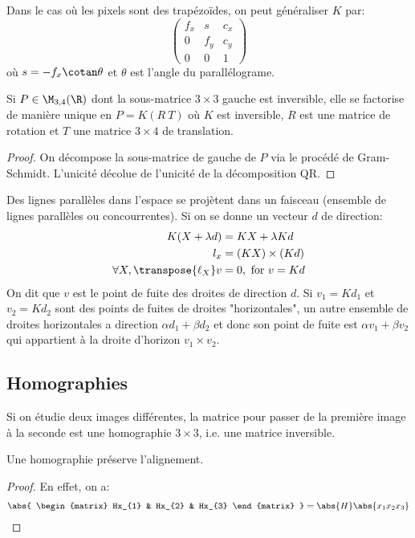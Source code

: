 \documentclass[info, math]{mpb-cours}
\begin{document}
Dans le cas où les pixels sont des trapézoïdes, on peut généraliser $K$ par:
\begin{equation*}
	\begin{pmatrix}
		f_{x} & s & c_{x} \\ 0 & f_{y} & c_{y}\\ 0 & 0 & 1
	\end{pmatrix}
\end{equation*}
où $s = -f_{x} \cotan \theta$ et $\theta$ est l'angle du parallélograme.

\begin{thm}
	Si $P \in \M_{3, 4}(\R)$ dont la sous-matrice $3\times 3$ gauche est inversible, elle se
	factorise de manière unique en $P = K (R \ T)$ où $K$ est inversible, $R$ est une matrice
	de rotation et $T$ une matrice $3 \times 4$ de translation.
\end{thm}
\begin{proof}
	On décompose la sous-matrice de gauche de $P$ via le procédé de Gram-Schmidt. L'unicité décolue de l'unicité de la décomposition QR.
\end{proof}

Des lignes parallèles dans l'espace se projètent dans un faisceau (ensemble de lignes parallèles ou concourrentes).
Si on se donne un vecteur $d$ de direction:
\begin{equation*}
	\begin{aligned}
		K(X + \lambda d)                 & = KX + \lambda Kd        \\
		l_{x}                            & = (KX) \times (Kd)       \\
		\forall X, \transpose{\ell_{X}}v & = 0, \text{ for } v = Kd
	\end{aligned}
\end{equation*}
On dit que $v$ est le point de fuite des droites de direction $d$.
Si $v_{1} = Kd_{1}$ et $v_{2} = Kd_{2}$ sont des points de fuites de droites "horizontales", un autre ensemble
de droites horizontales a direction $\alpha d_{1} + \beta d_{2}$ et donc son point de fuite est $\alpha v_{1} + \beta v_{2}$
qui appartient à la droite d'horizon $v_{1} \times v_{2}$.

\subsection{Homographies}
Si on étudie deux images différentes, la matrice pour passer de la première image à la seconde est une homographie $3 \times 3$, i.e. une matrice inversible.
\begin{proposition}
	Une homographie préserve l'alignement.
\end{proposition}
\begin{proof}
	En effet, on a:
	\begin{equation*}
		\abs{
			\begin{matrix}
				Hx_{1} & Hx_{2} & Hx_{3}
			\end{matrix}
		} = \abs{H} \abs{\begin{matrix} x_{1}x_{2}x_{3}\end{matrix}}
	\end{equation*}
\end{proof}
\end{document}
